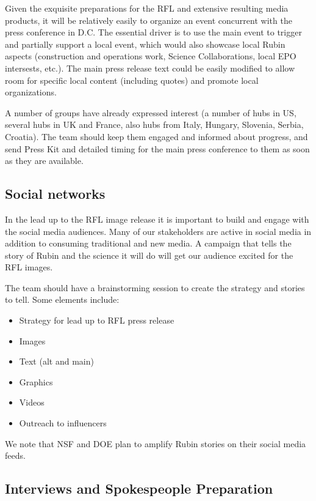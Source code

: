 Given the exquisite preparations for the RFL and extensive resulting media products, it will be
relatively easily to organize an event concurrent with the press conference in D.C. The essential
driver is to use the main event to trigger and partially support a local event, which would also
showcase local Rubin aspects (construction and operations work, Science Collaborations, local
EPO intersests, etc.). The main press release text could be easily modified to allow room for
specific local content (including quotes) and promote local organizations. 

A number of groups have already expressed interest (a number of hubs in US, several hubs in
UK and France, also hubs from Italy, Hungary, Slovenia, Serbia, Croatia). The team should keep
them engaged and informed about progress, and send Press Kit and detailed timing for the
main press conference to them as soon as they are available. 



\subsection{Social networks}

In the lead up to the RFL image release it is important to build and engage with the social media audiences.
Many of our stakeholders are active in social media in addition to consuming traditional and new media.
A campaign that tells the story of Rubin and the science it will do will get our audience excited for the RFL images.

The team should have a brainstorming session to create the strategy and stories to tell. Some elements include:
\begin{itemize}
\item Strategy for lead up to RFL press release
\item Images
\item Text  (alt and main)
\item Graphics
\item Videos
\item Outreach to influencers
\end{itemize}

We note that NSF and DOE plan to amplify Rubin stories on their social media feeds. 

\subsection{Interviews and Spokespeople Preparation \label{interviews}} 

